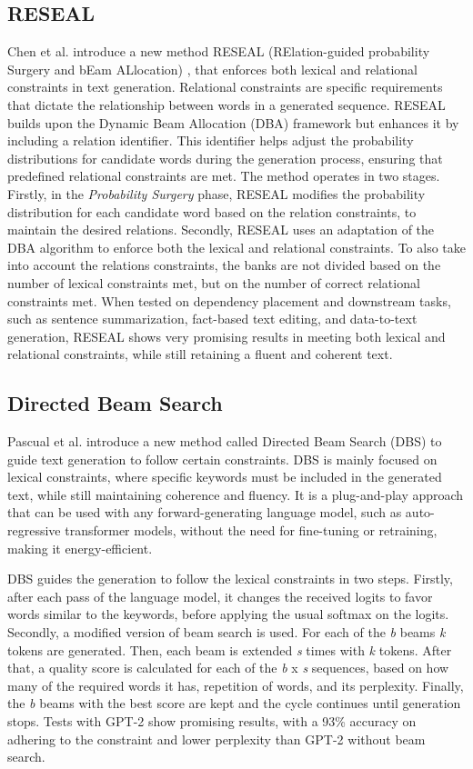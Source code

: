 \subsection{RESEAL}
Chen et al. introduce a new method RESEAL (RElation-guided probability Surgery and bEam ALlocation) \cite{chen_relation-constrained_2022}, that enforces both lexical and relational constraints in text generation.  Relational constraints are specific requirements that dictate the relationship between words in a generated sequence.  RESEAL builds upon the Dynamic Beam Allocation (DBA) framework but enhances it by including a relation identifier. This identifier helps adjust the probability distributions for candidate words during the generation process, ensuring that predefined relational constraints are met. The method operates in two stages. Firstly, in the \textit{Probability Surgery} phase, RESEAL modifies the probability distribution for each candidate word based on the relation constraints, to maintain the desired relations. Secondly, RESEAL uses an adaptation of the DBA algorithm to enforce both the lexical and relational constraints. To also take into account the relations constraints, the banks are not divided based on the number of lexical constraints met, but on the number of correct relational constraints met. When tested on dependency placement and downstream tasks, such as sentence summarization, fact-based text editing, and data-to-text generation, RESEAL shows very promising results in meeting both lexical and relational constraints, while still retaining a fluent and coherent text.

\subsection{Directed Beam Search}
Pascual et al. introduce a new method called Directed Beam Search (DBS) \cite{pascual_directed_2020} to guide text generation to follow certain constraints. DBS is mainly focused on lexical constraints, where specific keywords must be included in the generated text, while still maintaining coherence and fluency. It is a plug-and-play approach that can be used with any forward-generating language model, such as auto-regressive transformer models, without the need for fine-tuning or retraining, making it energy-efficient. 

DBS guides the generation to follow the lexical constraints in two steps. Firstly, after each pass of the language model, it changes the received logits to favor words similar to the keywords, before applying the usual softmax on the logits. Secondly, a modified version of beam search is used. For each of the \textit{b} beams \textit{k} tokens are generated. Then, each beam is extended \textit{s} times with \textit{k} tokens. After that, a quality score is calculated for each of the \textit{b} x \textit{s} sequences, based on how many of the required words it has, repetition of words, and its perplexity. Finally, the \textit{b} beams with the best score are kept and the cycle continues until generation stops. Tests with GPT-2 \cite{gpt-2} show promising results, with a 93\% accuracy on adhering to the constraint and lower perplexity than GPT-2 without beam search.  



